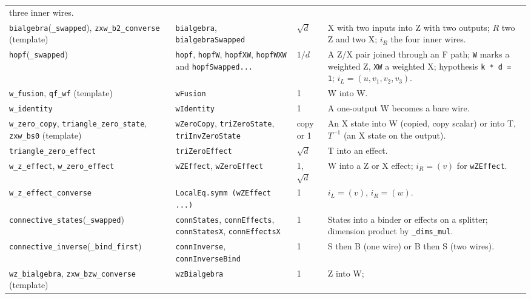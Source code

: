 {\begin{xltabular}{\linewidth}{@{}p{4.3cm}p{3.6cm}p{2.2cm}X@{}}
  three inner wires. \\
\texttt{bialgebra}(\texttt{\_\allowbreak{}swapped}), \texttt{zxw\_\allowbreak{}b2\_\allowbreak{}converse} (template) & \texttt{bialgebra},
  \texttt{bialgebraSwapped} & $\sqrt d$ & X with two inputs into Z with two outputs; $R$ two Z and
  two X; $i_R$ the four inner wires. \\
\texttt{hopf}(\texttt{\_\allowbreak{}swapped}) & \texttt{hopf}, \texttt{hopfW}, \texttt{hopfXW}, \texttt{hopfWXW} and
  \texttt{hopfSwapped...} & $1/d$ & A Z/X pair joined through an F path; \texttt{W} marks a weighted Z,
  \texttt{XW} a weighted X; hypothesis \texttt{k * d = 1}; $i_L = (u, v_1, v_2, v_3)$. \\
\texttt{w\_\allowbreak{}fusion}, \texttt{qf\_\allowbreak{}wf} (template) & \texttt{wFusion} & 1 & W into W. \\
\texttt{w\_\allowbreak{}identity} & \texttt{wIdentity} & 1 & A one-output W becomes a bare wire. \\
\texttt{w\_\allowbreak{}zero\_\allowbreak{}copy}, \texttt{triangle\_\allowbreak{}zero\_\allowbreak{}state}, \texttt{zxw\_\allowbreak{}bs0} (template) & \texttt{wZeroCopy},
  \texttt{triZeroState}, \texttt{triInvZeroState} & copy or 1 & An X state into W (copied, copy
  scalar) or into T, $T^{-1}$ (an X state on the output). \\
\texttt{triangle\_\allowbreak{}zero\_\allowbreak{}effect} & \texttt{triZeroEffect} & $\sqrt d$ & T into an effect. \\
\texttt{w\_\allowbreak{}z\_\allowbreak{}effect}, \texttt{w\_\allowbreak{}zero\_\allowbreak{}effect} & \texttt{wZEffect}, \texttt{wZeroEffect} & 1, $\sqrt d$ &
  W into a Z or X effect; $i_R=(v)$ for \texttt{wZEffect}. \\
\texttt{w\_\allowbreak{}z\_\allowbreak{}effect\_\allowbreak{}converse} & \texttt{LocalEq.symm\textquotesingle{} (wZEffect ...)} & 1 & $i_L=(v)$, $i_R=(w)$. \\
\texttt{connective\_\allowbreak{}states}(\texttt{\_\allowbreak{}swapped}) & \texttt{connStates}, \texttt{connEffects},
  \texttt{connStatesX}, \texttt{connEffectsX} & 1 & States into a binder or effects on a splitter;
  dimension product by \texttt{\_\allowbreak{}dims\_\allowbreak{}mul}. \\
\texttt{connective\_\allowbreak{}inverse}(\texttt{\_\allowbreak{}bind\_\allowbreak{}first}) & \texttt{connInverse}, \texttt{connInverseBind} & 1 &
  S then B (one wire) or B then S (two wires). \\
\texttt{wz\_\allowbreak{}bialgebra}, \texttt{zxw\_\allowbreak{}bzw\_\allowbreak{}converse} (template) & \texttt{wzBialgebra} & 1 & Z into W;

\end{xltabular}}
